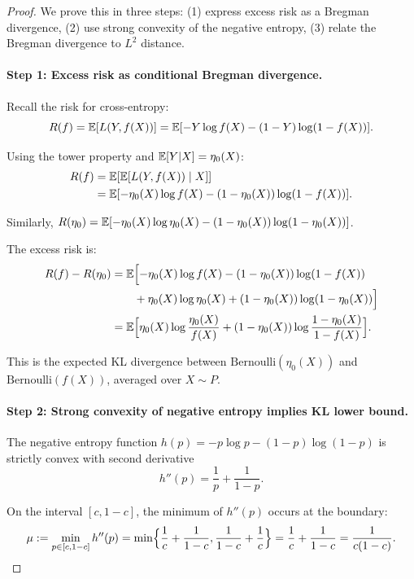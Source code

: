 \documentclass[12pt]{article}
\begin{document}
\begin{proof}
We prove this in three steps: (1) express excess risk as a Bregman divergence, (2) use strong convexity of the negative entropy, (3) relate the Bregman divergence to $L^2$ distance.

\paragraph{Step 1: Excess risk as conditional Bregman divergence.}

Recall the risk for cross-entropy:
\[
R(f) = \mathbb{E}[L(Y, f(X))] = \mathbb{E}[-Y \log f(X) - (1-Y) \log(1-f(X))].
\]

Using the tower property and $\mathbb{E}[Y|X] = \eta_0(X)$:
\begin{align*}
R(f)
&= \mathbb{E}[\mathbb{E}[L(Y, f(X)) \mid X]] \\
&= \mathbb{E}[-\eta_0(X) \log f(X) - (1-\eta_0(X)) \log(1-f(X))].
\end{align*}

Similarly, $R(\eta_0) = \mathbb{E}[-\eta_0(X) \log \eta_0(X) - (1-\eta_0(X)) \log(1-\eta_0(X))]$.

The excess risk is:
\begin{align}
R(f) - R(\eta_0)
&= \mathbb{E}\Bigl[ -\eta_0(X) \log f(X) - (1-\eta_0(X)) \log(1-f(X)) \nonumber \\
&\quad\quad + \eta_0(X) \log \eta_0(X) + (1-\eta_0(X)) \log(1-\eta_0(X)) \Bigr] \nonumber \\
&= \mathbb{E}\Bigl[ \eta_0(X) \log \frac{\eta_0(X)}{f(X)} + (1-\eta_0(X)) \log \frac{1-\eta_0(X)}{1-f(X)} \Bigr]. \label{eq:kl-divergence}
\end{align}

This is the expected KL divergence between $\text{Bernoulli}(\eta_0(X))$ and $\text{Bernoulli}(f(X))$, averaged over $X \sim P$.

\paragraph{Step 2: Strong convexity of negative entropy implies KL lower bound.}

The negative entropy function $h(p) = -p \log p - (1-p) \log(1-p)$ is strictly convex with second derivative
\[
h''(p) = \frac{1}{p} + \frac{1}{1-p}.
\]

On the interval $[c, 1-c]$, the minimum of $h''(p)$ occurs at the boundary:
\[
\mu := \min_{p \in [c,1-c]} h''(p) = \min\Bigl\{ \frac{1}{c} + \frac{1}{1-c}, \frac{1}{1-c} + \frac{1}{c} \Bigr\} = \frac{1}{c} + \frac{1}{1-c} = \frac{1}{c(1-c)}.
\]


\end{proof}
\end{document}
